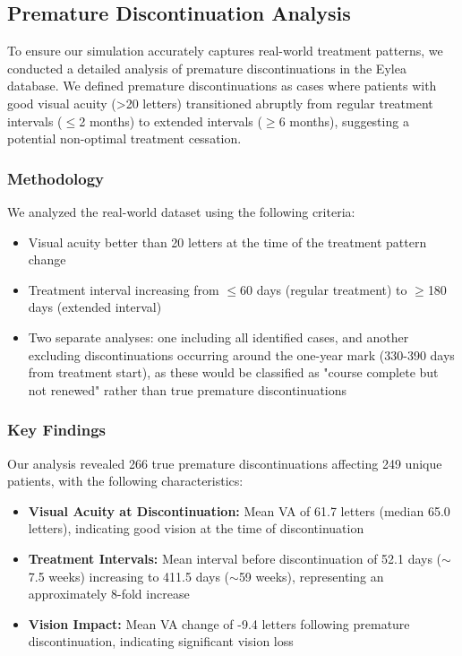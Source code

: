 \subsection{Premature Discontinuation Analysis}

To ensure our simulation accurately captures real-world treatment patterns, we conducted a detailed analysis of premature discontinuations in the Eylea database. We defined premature discontinuations as cases where patients with good visual acuity (>20 letters) transitioned abruptly from regular treatment intervals ($\leq$2 months) to extended intervals ($\geq$6 months), suggesting a potential non-optimal treatment cessation.

\subsubsection{Methodology}

We analyzed the real-world dataset using the following criteria:
\begin{itemize}
    \item Visual acuity better than 20 letters at the time of the treatment pattern change
    \item Treatment interval increasing from $\leq$60 days (regular treatment) to $\geq$180 days (extended interval)
    \item Two separate analyses: one including all identified cases, and another excluding discontinuations occurring around the one-year mark (330-390 days from treatment start), as these would be classified as "course complete but not renewed" rather than true premature discontinuations
\end{itemize}

\subsubsection{Key Findings}

Our analysis revealed 266 true premature discontinuations affecting 249 unique patients, with the following characteristics:

\begin{itemize}
    \item \textbf{Visual Acuity at Discontinuation:} Mean VA of 61.7 letters (median 65.0 letters), indicating good vision at the time of discontinuation
    
    \item \textbf{Treatment Intervals:} Mean interval before discontinuation of 52.1 days ($\sim$7.5 weeks) increasing to 411.5 days ($\sim$59 weeks), representing an approximately 8-fold increase
    
    \item \textbf{Vision Impact:} Mean VA change of -9.4 letters following premature discontinuation, indicating significant vision loss
\end{itemize}

